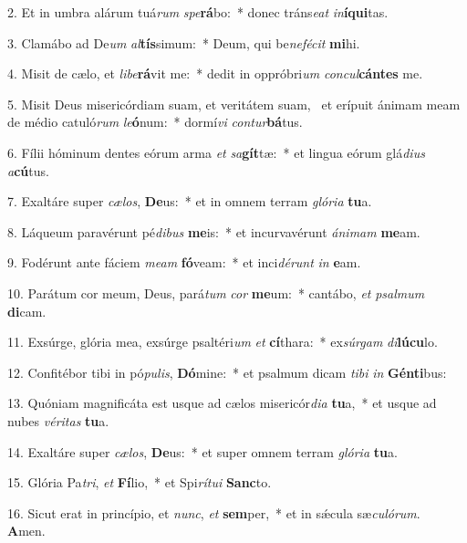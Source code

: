 2. Et in umbra alárum tuá\textit{rum} \textit{spe}\textbf{rá}bo:~*  donec tráns\textit{e}\textit{at} \textit{in}\textbf{í}\textbf{qui}tas.\

3. Clamábo ad De\textit{um} \textit{al}\textbf{tís}simum:~*  Deum, qui be\textit{ne}\textit{fé}\textit{cit} \textbf{mi}hi.\

4. Misit de cælo, et \textit{li}\textit{be}\textbf{rá}vit me:~*  dedit in oppróbri\textit{um} \textit{con}\textit{cul}\textbf{cán}\textbf{tes} me.\

5. Misit Deus misericórdiam suam, et veritátem suam, \dag\  et erípuit ánimam meam de médio catuló\textit{rum} \textit{le}\textbf{ó}num:~*  dormí\textit{vi} \textit{con}\textit{tur}\textbf{bá}tus.\

6. Fílii hóminum dentes eórum arma \textit{et} \textit{sa}\textbf{gít}tæ:~*  et lingua eórum glá\textit{di}\textit{us} \textit{a}\textbf{cú}tus.\

7. Exaltáre super \textit{cæ}\textit{los}, \textbf{De}us:~*  et in omnem terram \textit{gló}\textit{ri}\textit{a} \textbf{tu}a.\

8. Láqueum paravérunt pé\textit{di}\textit{bus} \textbf{me}is:~*  et incurvavérunt \textit{á}\textit{ni}\textit{mam} \textbf{me}am.\

9. Fodérunt ante fáciem \textit{me}\textit{am} \textbf{fó}veam:~*  et inci\textit{dé}\textit{runt} \textit{in} \textbf{e}am.\

10. Parátum cor meum, Deus, pará\textit{tum} \textit{cor} \textbf{me}um:~*  cantábo, \textit{et} \textit{psal}\textit{mum} \textbf{di}cam.\

11. Exsúrge, glória mea, exsúrge psaltéri\textit{um} \textit{et} \textbf{cí}thara:~*  ex\textit{súr}\textit{gam} \textit{di}\textbf{lú}\textbf{cu}lo.\

12. Confitébor tibi in pó\textit{pu}\textit{lis}, \textbf{Dó}mine:~*  et psalmum dicam \textit{ti}\textit{bi} \textit{in} \textbf{Gén}\textbf{ti}bus:\

13. Quóniam magnificáta est usque ad cælos misericór\textit{di}\textit{a} \textbf{tu}a,~*  et usque ad nubes \textit{vé}\textit{ri}\textit{tas} \textbf{tu}a.\

14. Exaltáre super \textit{cæ}\textit{los}, \textbf{De}us:~*  et super omnem terram \textit{gló}\textit{ri}\textit{a} \textbf{tu}a.\

15. Glória Pa\textit{tri}, \textit{et} \textbf{Fí}lio,~*  et Spi\textit{rí}\textit{tu}\textit{i} \textbf{Sanc}to.\

16. Sicut erat in princípio, et \textit{nunc}, \textit{et} \textbf{sem}per,~*  et in sǽcula sæ\textit{cu}\textit{ló}\textit{rum}. \textbf{A}men.\

